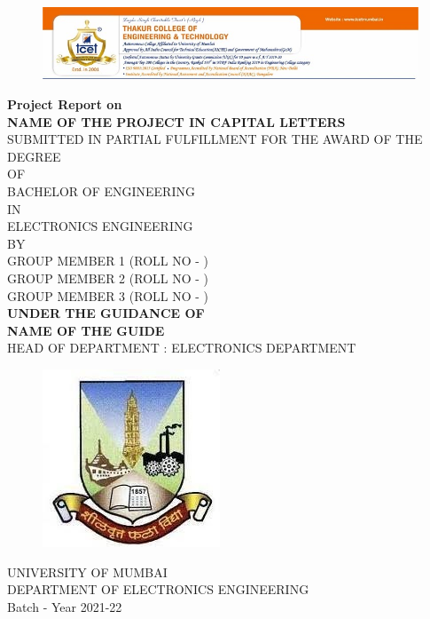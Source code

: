 \documentclass{book}
\begin{document}
	\thispagestyle{empty}
	
\begin{figure}[h]
	\centering
	\includegraphics[scale=0.63]{tcetlogo.jpg}
	\end{figure}

\begin{center}
	\textbf{Project Report on\\} 
		\Huge
		\textbf{NAME OF THE PROJECT IN CAPITAL LETTERS\\}
	\vspace{0.5cm}
	\normalsize
	SUBMITTED IN PARTIAL FULFILLMENT FOR THE AWARD OF THE DEGREE \\
		OF \\

	BACHELOR OF ENGINEERING \\
	IN \\
	ELECTRONICS ENGINEERING \\
	BY\\\vspace{0.5cm}
	GROUP MEMBER 1 (ROLL NO - )\\ GROUP MEMBER 2 (ROLL NO - )\\ GROUP MEMBER 3 (ROLL NO - ) \\ 
		\vspace{0.5cm}
	\textbf{UNDER THE GUIDANCE OF \\ NAME OF THE GUIDE}\\\vspace{0.5cm}
	HEAD OF DEPARTMENT : ELECTRONICS DEPARTMENT\\
	\begin{figure}[h]
		\centering
		\includegraphics[scale=1.5]{uom1.jpg}
	\end{figure}
\vspace{0.5cm}
UNIVERSITY OF MUMBAI \\ DEPARTMENT OF ELECTRONICS ENGINEERING \\ Batch - Year 2021-22\\
	
\end{center}
\end{document}
